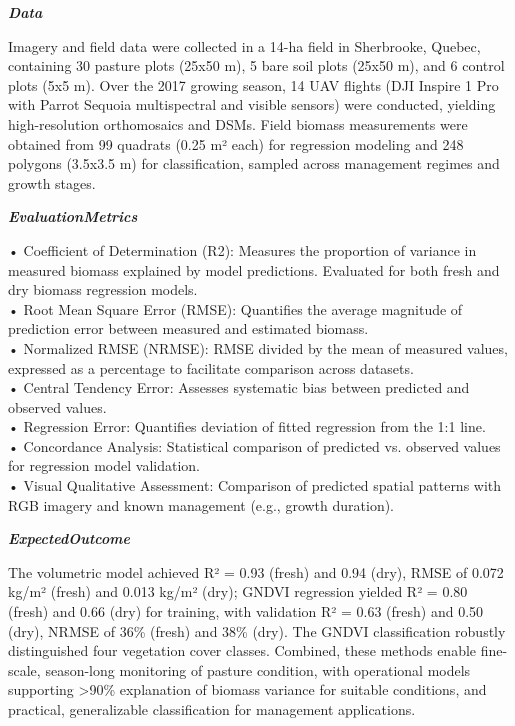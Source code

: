 \begin{tcolorbox}[
    breakable,
    title={Example of Idea Generation in Earth},
    colback=LighterGray,
    colframe=DeepPurple,
    colbacktitle=DeepPurple,
    coltitle=White,
]
\textbf{\emph{\textcolor{CaseOrange}{Data}}}

Imagery and field data were collected in a 14-ha field in Sherbrooke, Quebec, containing 30 pasture
plots (25x50 m), 5 bare soil plots (25x50 m), and 6 control plots (5x5 m). Over the 2017 growing
season, 14 UAV flights (DJI Inspire 1 Pro with Parrot Sequoia multispectral and visible sensors)
were conducted, yielding high-resolution orthomosaics and DSMs. Field biomass measurements were
obtained from 99 quadrats (0.25 m² each) for regression modeling and 248 polygons (3.5x3.5 m) for
classification, sampled across management regimes and growth stages.

\textbf{\emph{\textcolor{CaseOrange}{EvaluationMetrics}}}

• Coefficient of Determination (R2): Measures the proportion of variance in measured biomass explained by model predictions. Evaluated for both fresh and dry biomass regression models. \\
• Root Mean Square Error (RMSE): Quantifies the average magnitude of prediction error between measured and estimated biomass. \\
• Normalized RMSE (NRMSE): RMSE divided by the mean of measured values, expressed as a percentage to facilitate comparison across datasets. \\
• Central Tendency Error: Assesses systematic bias between predicted and observed values. \\
• Regression Error: Quantifies deviation of fitted regression from the 1:1 line. \\
• Concordance Analysis: Statistical comparison of predicted vs. observed values for regression model validation. \\
• Visual Qualitative Assessment: Comparison of predicted spatial patterns with RGB imagery and known management (e.g., growth duration). 

\textbf{\emph{\textcolor{CaseOrange}{ExpectedOutcome}}}

The volumetric model achieved R² = 0.93 (fresh) and 0.94 (dry), RMSE of 0.072 kg/m² (fresh) and
0.013 kg/m² (dry); GNDVI regression yielded R² = 0.80 (fresh) and 0.66 (dry) for training, with
validation R² = 0.63 (fresh) and 0.50 (dry), NRMSE of 36\% (fresh) and 38\% (dry). The GNDVI
classification robustly distinguished four vegetation cover classes. Combined, these methods enable
fine-scale, season-long monitoring of pasture condition, with operational models supporting >90\%
explanation of biomass variance for suitable conditions, and practical, generalizable classification
for management applications.

\end{tcolorbox}




